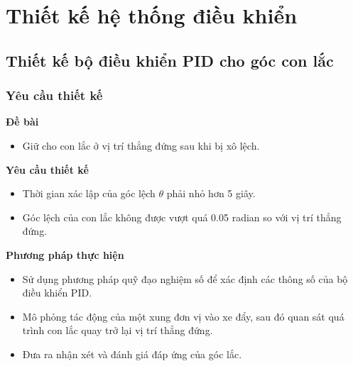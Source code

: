 \documentclass[12pt,a4paper]{article}
\begin{document}
\newpage
\section{Thiết kế hệ thống điều khiển}
\subsection{Thiết kế bộ điều khiển PID cho góc con lắc}
\subsubsection{Yêu cầu thiết kế}
\begin{minipage}[t]{0.3\linewidth}
    \textbf{Đề bài}
\end{minipage}\begin{minipage}[t]{0.6\linewidth}
    \begin{itemize}
        \item Giữ cho con lắc ở vị trí thẳng đứng sau khi bị xô lệch. 
    \end{itemize}
\end{minipage}

\vspace{\baselineskip}

\begin{minipage}[t]{0.3\linewidth}
    \textbf{Yêu cầu thiết kế}
\end{minipage}\begin{minipage}[t]{0.6\linewidth}
    \begin{itemize}[noitemsep,topsep=0pt]
        \item Thời gian xác lập của góc lệch $\theta$ phải nhỏ hơn 5 giây.
        \item Góc lệch của con lắc không được vượt quá 0.05 radian so với vị trí thẳng đứng.
    \end{itemize}
\end{minipage}

\vspace{\baselineskip}

\begin{minipage}[t]{0.3\linewidth}
    \textbf{Phương pháp thực hiện}
\end{minipage}\begin{minipage}[t]{0.6\linewidth}
    \begin{itemize}[noitemsep,topsep=0pt]
        \item Sử dụng phương pháp quỹ đạo nghiệm số để xác định các thông số của bộ điều khiển PID.
        \item Mô phỏng tác động của một xung đơn vị vào xe đẩy, sau đó quan sát quá trình con lắc quay trở lại vị trí thẳng đứng.
        \item Đưa ra nhận xét và đánh giá đáp ứng của góc lắc.
    \end{itemize}
\end{minipage}
\end{document}

